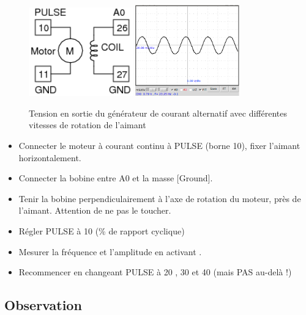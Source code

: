 \documentclass{book}
\begin{document}
\begin{figure}[h!]
\begin{center}
\caption{\label{fig:AC-generator-output}Tension en sortie du générateur de courant alternatif avec différentes vitesses de rotation de l'aimant }\vspace{0.5em}
\includegraphics[width=0.4\textwidth, height=0.3\textwidth, keepaspectratio]{Schematic-ac-gen.png}
\includegraphics[width=0.4\textwidth, height=0.3\textwidth, keepaspectratio]{Pic-ACgen-output-30pct.png}
\end{center}
\end{figure}



\begin{itemize}
  \item Connecter le moteur à courant continu à PULSE (borne 10), fixer l'aimant horizontalement.
  \item Connecter la bobine entre A0 et la masse [Ground].
  \item Tenir la bobine perpendiculairement à l'axe de rotation du moteur, près de l'aimant. Attention de ne pas le toucher.
  \item Régler PULSE à 10 (\%{} de rapport cyclique)
  \item Mesurer la fréquence et l'amplitude en activant  .
  \item Recommencer en changeant PULSE à 20 , 30 et 40 (mais PAS au-delà !)
\end{itemize}

\subsection{Observation}
\end{document}

